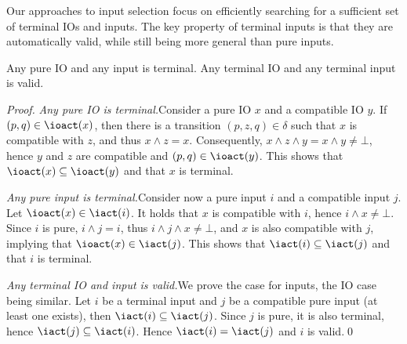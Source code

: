 \documentclass[runningheads,a4paper]{llncs}
\begin{document}
Our approaches to input selection focus on efficiently searching for a
sufficient set of terminal IOs and inputs.  The key property of terminal inputs
is that they are automatically valid, while still being more general than pure
inputs.
\begin{proposition}
  Any pure IO and any input is terminal.  Any terminal IO and any terminal input
  is valid.
\end{proposition}
\begin{proof}
  \emph{Any pure IO is terminal.}\quad Consider a pure IO \(x\) and a compatible IO
  \(y\).  If \((p, q) \in \ioact(x)\), then there is a transition
  \((p, z, q) \in \delta\) such that \(x\) is compatible with \(z\), and thus
  \(x \land z = x\).  Consequently, \(x \land z \land y = x \land y \neq \bot\), hence
  \(y\) and \(z\) are compatible and \((p, q) \in \ioact(y)\).  This shows that
  \(\ioact(x) \subseteq \ioact(y)\) and that \(x\) is terminal.

  \emph{Any pure input is terminal.}\quad Consider now a pure input \(i\) and a
  compatible input \(j\).  Let \(\ioact(x) \in \iact(i)\).  It holds that \(x\) is
  compatible with \(i\), hence \(i \land x \neq \bot\).  Since \(i\) is pure,
  \(i \land j = i\), thus \(i \land j \land x \neq \bot\), and \(x\) is also compatible with
  \(j\), implying that \(\ioact(x) \in \iact(j)\).  This shows that
  \(\iact(i) \subseteq \iact(j)\) and that \(i\) is terminal.

  \emph{Any terminal IO and input is valid.}\quad We prove the case for inputs, the
  IO case being similar.  Let \(i\) be a terminal input and \(j\) be a compatible
  pure input (at least one exists), then \(\iact(i) \subseteq \iact(j)\).  Since
  \(j\) is pure, it is also terminal, hence \(\iact(j) \subseteq \iact(i)\).  Hence
  \(\iact(i) = \iact(j)\) and \(i\) is valid.\qed
\end{proof}
\end{document}
